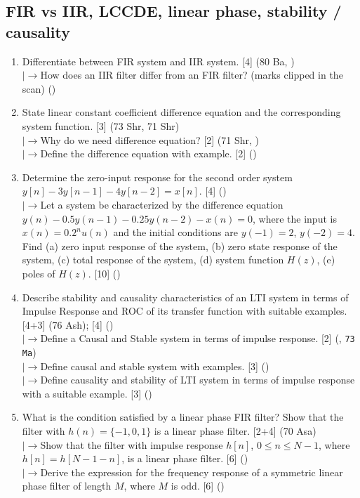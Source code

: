 \documentclass[12pt]{article}
\newcommand{\lb}{\\$\left|\rightarrow\right.$}
\begin{document}
  \subsection{FIR vs IIR, LCCDE, linear phase, stability / causality}
    \begin{enumerate}[topsep=0pt, noitemsep]
      \item Differentiate between FIR system and IIR system. \hfill [4] (80 Ba, )
        \lb How does an IIR filter differ from an FIR filter? \hfill (marks clipped in the scan) ()
      \item State linear constant coefficient difference equation and the corresponding system function. \hfill [3] (73 Shr, 71 Shr)
        \lb Why do we need difference equation? \hfill [2] (71 Shr, )
        \lb Define the difference equation with example. \hfill [2] ()
      \item Determine the zero-input response for the second order system $y[n]-3y[n-1]-4y[n-2]=x[n]$. \hfill [4] ()
        \lb Let a system be characterized by the difference equation $y(n)-0.5y(n-1)-0.25y(n-2)-x(n)=0$, where the input is $x(n)=0.2^n u(n)$ and the initial conditions are $y(-1)=2$, $y(-2)=4$. Find (a) zero input response of the system, (b) zero state response of the system, (c) total response of the system, (d) system function $H(z)$, (e) poles of $H(z)$. \hfill [10] ()
      \item Describe stability and causality characteristics of an LTI system in terms of Impulse Response and ROC of its transfer function with suitable examples. \hfill [4+3] (76 Ash); [4] ()
        \lb Define a Causal and Stable system in terms of impulse response. \hfill [2] (, \texttt{73 Ma})
        \lb Define causal and stable system with examples. \hfill [3] ()
        \lb Define causality and stability of LTI system in terms of impulse response with a suitable example. \hfill [3] ()
      \item What is the condition satisfied by a linear phase FIR filter? Show that the filter with $h(n)=\{-1,0,1\}$ is a linear phase filter. \hfill [2+4] (70 Asa)
        \lb Show that the filter with impulse response $h[n]$, $0\le n\le N-1$, where $h[n]=h[N-1-n]$, is a linear phase filter. \hfill [6] ()
        \lb Derive the expression for the frequency response of a symmetric linear phase filter of length $M$, where $M$ is odd. \hfill [6] ()
    \end{enumerate}
\end{document}
